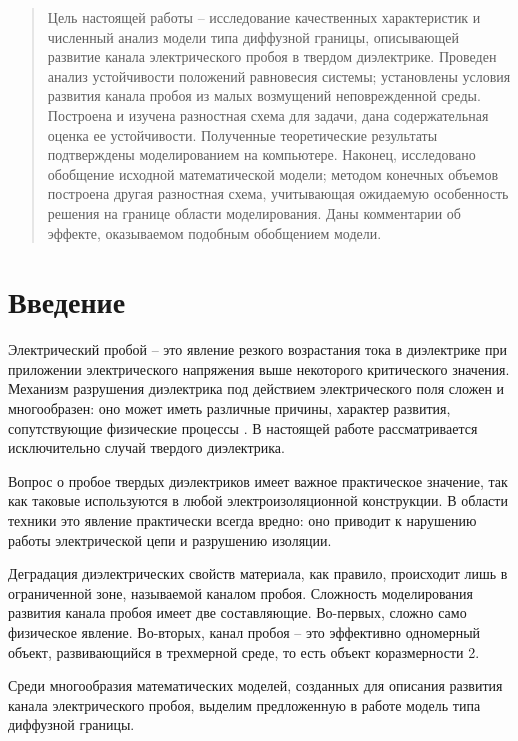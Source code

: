 \documentclass[a4paper,12pt]{article}
\theoremstyle{plain}
\theoremstyle{definition}
\begin{document}


\begin{abstract}
    Цель настоящей работы -- исследование качественных характеристик и численный анализ модели типа диффузной границы, описывающей развитие канала электрического пробоя в твердом диэлектрике. Проведен анализ устойчивости положений равновесия системы; установлены условия развития канала пробоя из малых возмущений неповрежденной среды. Построена и изучена разностная схема для задачи, дана содержательная оценка ее устойчивости. Полученные теоретические результаты подтверждены моделированием на компьютере. Наконец, исследовано обобщение исходной математической модели; методом конечных объемов построена другая разностная схема, учитывающая ожидаемую особенность решения на границе области моделирования. Даны комментарии об эффекте, оказываемом подобным обобщением модели.
\end{abstract}

\setcounter{page}{2}
\tableofcontents
\pagebreak


\section{Введение}

Электрический пробой -- это явление резкого возрастания тока в диэлектрике при приложении электрического напряжения выше некоторого критического значения. Механизм разрушения диэлектрика под действием электрического поля сложен и многообразен: оно может иметь различные причины, характер развития, сопутствующие физические процессы \cite{vorobiev_dielectric_physics}. В настоящей работе рассматривается исключительно случай твердого диэлектрика.

Вопрос о пробое твердых диэлектриков имеет важное практическое значение, так как таковые используются в любой электроизоляционной конструкции. В области техники это явление практически всегда вредно: оно приводит к нарушению работы электрической цепи и разрушению изоляции.

Деградация диэлектрических свойств материала, как правило, происходит лишь в ограниченной зоне, называемой каналом пробоя. Сложность моделирования развития канала пробоя имеет две составляющие. Во-первых, сложно само физическое явление. Во-вторых, канал пробоя -- это эффективно одномерный объект, развивающийся в трехмерной среде, то есть объект коразмерности 2.

Среди многообразия математических моделей, созданных для описания развития канала электрического пробоя, выделим предложенную в работе \cite{pitike_dielectric_breakdown} модель типа диффузной границы.
\end{document}
